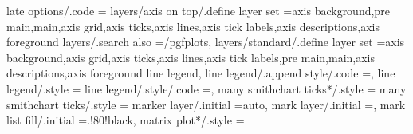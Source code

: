 {{{{{{{{{{{{{{{{{{{{{{{{{{{{{{{{{{{{{{{{{{{{{{{{{{{{{{{{{late options/.code                                                 ={%
layers/axis on top/.define layer set                               ={axis background,pre main,main,axis grid,axis ticks,axis lines,axis tick labels,axis descriptions,axis foreground}{                
layers/.search also                                                =/pgfplots,                                                                                                                         
layers/standard/.define layer set                                  ={axis background,axis grid,axis ticks,axis lines,axis tick labels,pre main,main,axis descriptions,axis foreground}{                
line legend,
line legend/.append style/.code                                    ={},%
line legend/.style                                                 ={%
line legend/.style/.code                                           ={},%
many smithchart ticks*/.style                                      ={                                                                                                                                  
many smithchart ticks/.style                                       ={                                                                                                                                  
marker layer/.initial                                              =auto,                                                                                                                              
mark layer/.initial                                                =,                                                                                                                                  
mark list fill/.initial                                            =.!80!black,                                                                                                                        
matrix plot*/.style                                                ={%
}}}}}}}}}}}}}}}}}}}}}}}}}}}}}}}}}}}}}}}}}}}}}}}}}}}}}}}}}}}}}}}}
